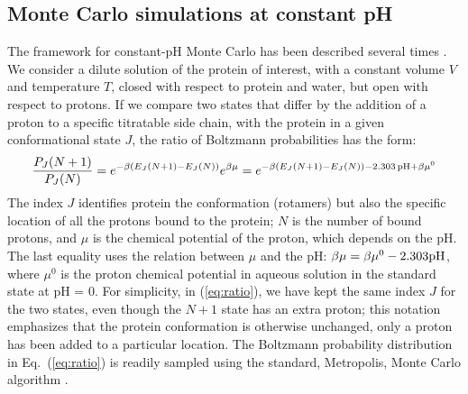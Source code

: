 \documentclass[a4paper,12pt]{article}
\begin{document}
\subsection{Monte Carlo simulations at constant pH}
The framework for constant-pH Monte Carlo has been described several times \cite{Baptista97,Lee04,Mongan04,Georgescu02,
Aleksandrov10b,Polydorides13}. We consider a dilute solution of the protein of interest, with a constant volume $V$ and
temperature $T$, closed with respect to protein and water, but open with respect to protons. If we compare two states
that differ by the addition of a proton to a specific titratable side chain, with the protein in a given conformational
state $J$, the ratio of Boltzmann probabilities has the form:
\begin{equation} \label{eq:ratio}
\frac{P_J(N+1)}{P_J(N)} = e^{-\beta (E_J(N+1) - E_J(N))} e^{\beta \mu}  = e^{-\beta (E_J(N+1) - E_J(N)) - 2.303 \, {\rm pH} + \beta \mu^0}
\end{equation}
The index $J$ identifies protein the conformation (rotamers) but also the specific location of all the protons bound to
the protein; $N$ is the number of bound protons, and $\mu$ is the chemical potential of the proton, which depends on the
pH. The last equality uses the relation between $\mu$ and the pH: $\beta \mu = \beta \mu^0 - 2.303 {\rm pH}$, where $\mu^0$
is the proton chemical potential in aqueous solution in the standard state at pH = 0. For simplicity, in (\ref{eq:ratio}),
we have kept the same index $J$ for the two states, even though the $N+1$ state has an extra proton; this notation emphasizes
that the protein conformation is otherwise unchanged, only a proton has been added to a particular location. The Boltzmann
probability distribution in Eq.\ (\ref{eq:ratio}) is readily sampled using the standard, Metropolis, Monte Carlo algorithm
\cite{FrenkelBK}.
\end{document}
